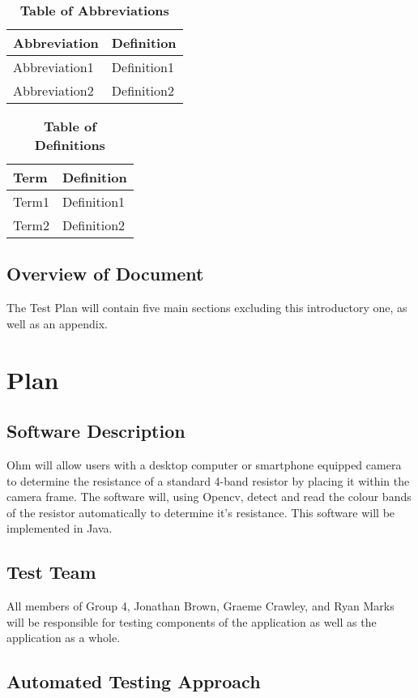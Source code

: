 \documentclass[12pt, titlepage]{article}
\begin{document}
\begin{table}[hbp]
\caption{\textbf{Table of Abbreviations}} \label{Table}
\begin{tabularx}{\textwidth}{p{3cm}X}
\toprule
\textbf{Abbreviation} & \textbf{Definition} \\
\midrule
Abbreviation1 & Definition1\\
Abbreviation2 & Definition2\\
\bottomrule
\end{tabularx}
\end{table}
\begin{table}[!htbp]
\caption{\textbf{Table of Definitions}} \label{Table}
\begin{tabularx}{\textwidth}{p{3cm}X}
\toprule
\textbf{Term} & \textbf{Definition}\\
\midrule
Term1 & Definition1\\
Term2 & Definition2\\
\bottomrule
\end{tabularx}
\end{table}	

\subsection{Overview of Document}
The Test Plan will contain five main sections excluding this introductory one, as well as an appendix. 

\section{Plan}
	
\subsection{Software Description}
Ohm will allow users with a desktop computer or smartphone equipped camera to determine the resistance of a standard 4-band resistor by placing it within the camera frame. The software will, using Opencv, detect and read the colour bands of the resistor automatically to determine it's resistance. This software will be implemented in Java.
\subsection{Test Team}
All members of Group 4, Jonathan Brown, Graeme Crawley, and Ryan Marks will be responsible for testing components of the application as well as the application as a whole.
\subsection{Automated Testing Approach}
\end{document}
